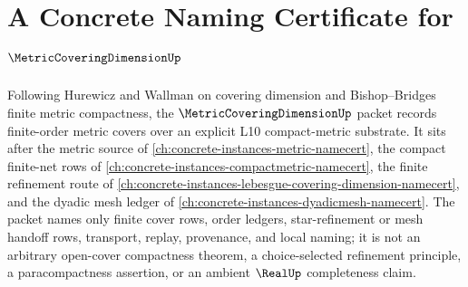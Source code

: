 \chapter{A Concrete Naming Certificate for $\MetricCoveringDimensionUp$}
\label{ch:concrete-instances-metric-covering-dimension-namecert}

Following Hurewicz and Wallman on covering dimension and Bishop--Bridges finite metric compactness, the $\MetricCoveringDimensionUp$ packet records finite-order metric covers over an explicit L10 compact-metric substrate. It sits after the metric source of \autoref{ch:concrete-instances-metric-namecert}, the compact finite-net rows of \autoref{ch:concrete-instances-compactmetric-namecert}, the finite refinement route of \autoref{ch:concrete-instances-lebesgue-covering-dimension-namecert}, and the dyadic mesh ledger of \autoref{ch:concrete-instances-dyadicmesh-namecert}. The packet names only finite cover rows, order ledgers, star-refinement or mesh handoff rows, transport, replay, provenance, and local naming; it is not an arbitrary open-cover compactness theorem, a choice-selected refinement principle, a paracompactness assertion, or an ambient $\RealUp$ completeness claim.

